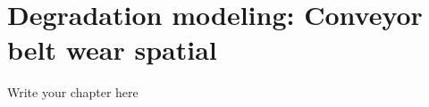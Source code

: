 
\chapter{Degradation modeling: Conveyor belt wear spatial}
\label{chap:chapter5}
Write your chapter here